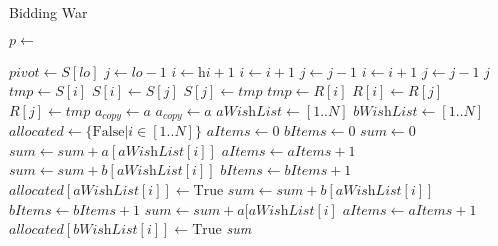 \documentclass[a4paper]{article}
\begin{document}
\begin{algorithm}
				\caption{Bidding War}
				\begin{algorithmic}
						\State $p \gets $ 
						\State {}
						\State {}
						\EndFunction

						\State $\textit{pivot} \gets S[lo]$
						\State $j \gets \textit{lo} - 1$
						\State $i \gets \textit{hi} + 1$
						\State $i \gets i + 1$
						\State $j \gets j - 1$
						\State $i \gets i + 1$
						\EndWhile
						\State $j \gets j - 1$
						\EndWhile
						 \Return $j$ \EndIf
						\State $\textit{tmp} \gets S[i]$
						\State $S[i] \gets S[j]$
						\State $S[j] \gets \textit{tmp}$
						\State $\textit{tmp} \gets R[i]$
						\State $R[i] \gets R[j]$
						\State $R[j] \gets \textit{tmp}$
						\EndWhile
						\EndFunction
						\State $a_{\textit{copy}} \gets a$
						\State $a_{\textit{copy}} \gets a$
						\State $\textit{aWishList} \gets [1..N]$
						\State $\textit{bWishList} \gets [1..N]$
						\State {}
						\State {}
						\State $\textit{allocated} \gets \{\text{False}|i\in[1..N]\}$
						\State $\textit{aItems} \gets 0$
						\State $\textit{bItems} \gets 0$
						\State $\textit{sum} \gets 0$
						\State $\textit{sum} \gets \textit{sum} + a[\textit{aWishList}[i]]$
						\State $\textit{aItems} \gets \textit{aItems} + 1$
						\Else 
						\State $\textit{sum} \gets \textit{sum} + b[\textit{aWishList}[i]]$
						\State $\textit{bItems} \gets \textit{bItems} + 1$
						\EndIf
						\State $\textit{allocated}[\textit{aWishList}[i]] \gets \text{True}$
						\EndIf
						\State $\textit{sum} \gets \textit{sum} + b[\textit{aWishList}[i]]$
						\State $\textit{bItems} \gets \textit{bItems} + 1$
						\Else 
						\State $\textit{sum} \gets \textit{sum} + a[\textit{aWishList}[i]$
						\State $\textit{aItems} \gets \textit{aItems} + 1$
						\EndIf
						\State $\textit{allocated}[\textit{bWishList}[i]] \gets \text{True}$
						\EndIf
						\EndWhile
						\State \Return \textit{sum}
						\EndFunction
				\end{algorithmic}
\end{algorithm}
\end{document}
